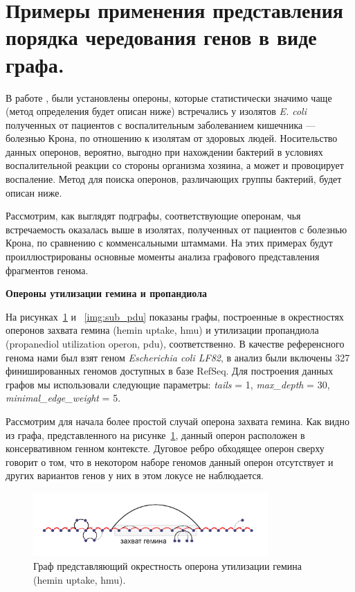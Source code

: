 \section{Примеры применения представления порядка чередования генов в виде графа.}

В работе \cite{rakitina2017genome}, были установлены опероны, которые статистически значимо чаще (метод определения будет описан ниже) встречались у изолятов \textit{E. coli} полученных от пациентов с воспалительным заболеванием кишечника --- болезнью Крона, по отношению к изолятам от здоровых людей. Носительство данных оперонов, вероятно, выгодно при нахождении бактерий в условиях воспалительной реакции со стороны организма хозяина, а может и провоцирует воспаление. Метод для поиска оперонов, различающих группы бактерий, будет описан ниже.

Рассмотрим, как выглядят подграфы, соответствующие оперонам, чья встречаемость оказалась выше в изолятах, полученных от пациентов с болезнью Крона, по сравнению с комменсальными штаммами. На этих примерах будут проиллюстрированы основные моменты анализа графового представления фрагментов генома. 

\textbf{Опероны утилизации гемина и пропандиола}

На рисунках~\ref{img:sub_hem} и ~\ref{img:sub_pdu} показаны графы, построенные в окрестностях оперонов захвата гемина (hemin uptake, hmu) и утилизации пропандиола (propanediol utilization operon, pdu), соответственно. В качестве референсного генома нами был взят геном \textit{Escherichia coli LF82}, в анализ были включены 327 финишированных геномов доступных в базе RefSeq. Для построения данных графов мы использовали следующие параметры: \textit{tails} = 1, \textit{max\_depth} = 30, \textit{minimal\_edge\_weight} = 5. 

Рассмотрим для начала более простой случай оперона захвата гемина. Как видно из графа, представленного на рисунке~\ref{img:sub_hem}, данный оперон расположен в консервативном генном контексте. Дуговое ребро обходящее оперон сверху говорит о том, что в некотором наборе геномов данный оперон отсутствует и других вариантов генов у них в этом локусе не наблюдается. 

\begin{figure}[!ht] 
  \center
  \includegraphics[width=0.8\textwidth]{Dissertation/images/subgraphs/hemin.png}
  \caption{Граф представляющий окрестность оперона утилизации гемина (hemin uptake, hmu).}
  \label{img:sub_hem} 
\end{figure}

